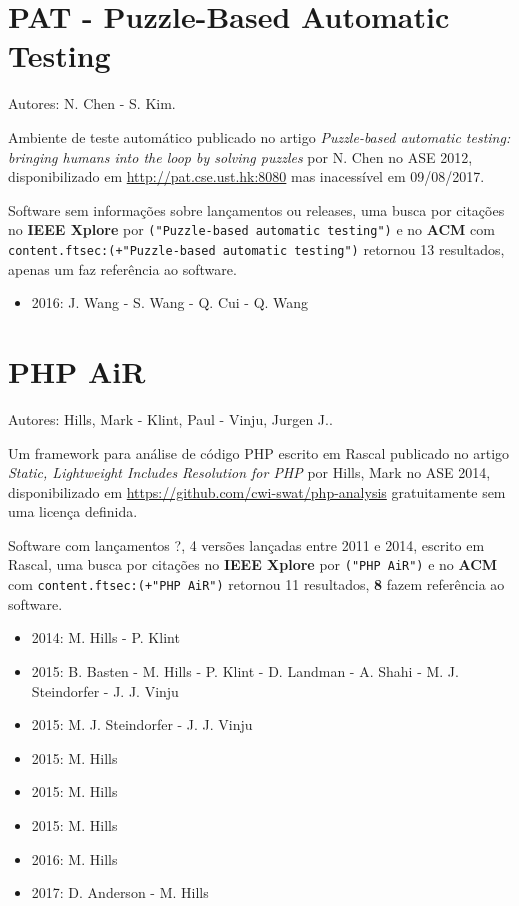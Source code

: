 \section{PAT - Puzzle-Based Automatic Testing}

Autores:
N. Chen - S. Kim.

Ambiente de teste automático
publicado no artigo {\it Puzzle-based automatic testing: bringing humans into the loop by solving puzzles}
por N. Chen
no ASE 2012,
disponibilizado em \url{http://pat.cse.ust.hk:8080}
mas inacessível em 09/08/2017.

Software sem informações sobre lançamentos ou releases,
uma busca por citações no {\bf IEEE Xplore} por
\texttt{("Puzzle-based automatic testing")}
e no {\bf ACM} com
\texttt{content.ftsec:(+"Puzzle-based automatic testing")}
retornou
13 resultados,
apenas um faz referência ao software.

\begin{itemize}
\item 2016: J. Wang - S. Wang - Q. Cui - Q. Wang
\end{itemize}

\section{PHP AiR}

Autores:
Hills, Mark - Klint, Paul - Vinju, Jurgen J..

Um framework para análise de código PHP escrito em Rascal
publicado no artigo {\it Static, Lightweight Includes Resolution for PHP}
por Hills, Mark
no ASE 2014,
disponibilizado em \url{https://github.com/cwi-swat/php-analysis}
gratuitamente
sem uma licença definida.

Software com lançamentos ?,
4 versões lançadas
entre 2011 e 2014,
escrito em Rascal,
uma busca por citações no {\bf IEEE Xplore} por
\texttt{("PHP AiR")}
e no {\bf ACM} com
\texttt{content.ftsec:(+"PHP AiR")}
retornou
11 resultados,
{\bf 8} fazem referência ao software.

\begin{itemize}
\item 2014: M. Hills - P. Klint
\item 2015: B. Basten - M. Hills - P. Klint - D. Landman - A. Shahi - M. J. Steindorfer - J. J. Vinju
\item 2015: M. J. Steindorfer - J. J. Vinju
\item 2015: M. Hills
\item 2015: M. Hills
\item 2015: M. Hills
\item 2016: M. Hills
\item 2017: D. Anderson - M. Hills
\end{itemize}

